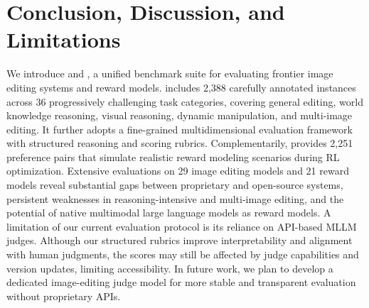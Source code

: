 \section{Conclusion, Discussion, and Limitations}
\label{sec:conclusion}
We introduce {\bench} and {\rmbench}, a unified benchmark suite for evaluating frontier image editing systems and reward models. {\bench} includes 2,388 carefully annotated instances across 36 progressively challenging task categories, covering general editing, world knowledge reasoning, visual reasoning, dynamic manipulation, and multi-image editing. It further adopts a fine-grained multidimensional evaluation framework with structured reasoning and scoring rubrics. Complementarily, {\rmbench} provides 2,251 preference pairs that simulate realistic reward modeling scenarios during RL optimization. Extensive evaluations on 29 image editing models and 21 reward models reveal substantial gaps between proprietary and open-source systems, persistent weaknesses in reasoning-intensive and multi-image editing, and the potential of native multimodal large language models as reward models.
A limitation of our current evaluation protocol is its reliance on API-based MLLM judges. Although our structured rubrics improve interpretability and alignment with human judgments, the scores may still be affected by judge capabilities and version updates, limiting accessibility. In future work, we plan to develop a dedicated image-editing judge model for more stable and transparent evaluation without proprietary APIs.